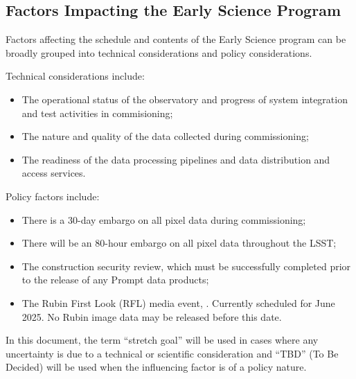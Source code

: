 \subsection{Factors Impacting the Early Science Program }
\label{ssec:impact}

Factors affecting the schedule and contents of the Early Science program can be broadly grouped into technical considerations and policy considerations. 

Technical considerations include:
\begin{itemize}
\item The operational status of the observatory and progress of system integration and test activities in commisioning; 
\item The nature and quality of the data collected during commissioning; 
\item The readiness of the data processing pipelines and data distribution and access services. 
\end{itemize}
Policy factors include:
\begin{itemize}
\item There is a 30-day embargo on all pixel data during commissioning;
\item There will be an 80-hour embargo on all pixel data throughout the LSST; 
\item The construction security review, which must be successfully completed prior to the release of any Prompt data products; 
\item The Rubin First Look (RFL) media event, . Currently scheduled for  June 2025. No Rubin image data may be released before this date. 
\end{itemize}
 
In this document, the term ``stretch goal'' will be used in cases where any uncertainty is due to a technical or scientific consideration and ``TBD'' (To Be Decided) will be used when the influencing factor is of a policy nature. 

